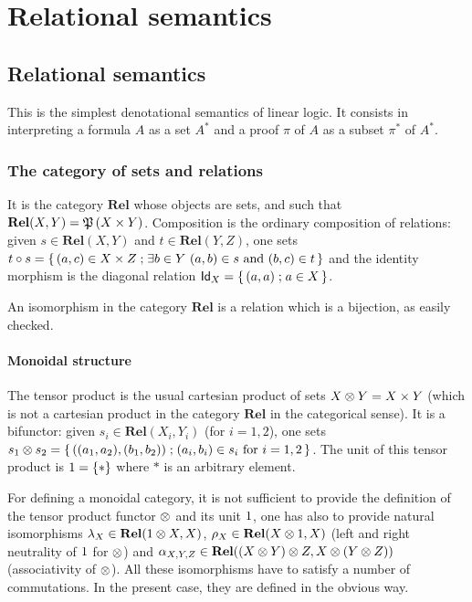 \section{Relational semantics}\label{relational-semantics}

\subsection{Relational semantics}\label{relational-semantics-1}

This is the simplest denotational semantics of linear logic. It consists
in interpreting a formula \(A\) as a set \(A^*\) and a proof \(\pi\) of
\(A\) as a subset \(\pi^*\) of \(A^*\).

\subsubsection{The category of sets and
relations}\label{the-category-of-sets-and-relations}

It is the category \(\mathbf{Rel}\) whose objects are sets, and such
that \(\mathbf{Rel}(X,Y)=\mathfrak{P}\left(X\times Y\right)\). Composition is the
ordinary composition of relations: given \(s\in\mathbf{Rel}(X,Y)\) and
\(t\in\mathbf{Rel}(Y,Z)\), one sets
\(t\circ s=\left\{\,{(a,c)\in X\times Z}\mathrel{;}{\exists b\in Y\ (a,b)\in s\ \text{and}\ (b,c)\in t}\,\right\}\)
and the identity morphism is the diagonal relation
\(\mathsf{Id}_X=\left\{\,{(a,a)}\mathrel{;}{a\in X}\,\right\}\).

An isomorphism in the category \(\mathbf{Rel}\) is a relation which is a
bijection, as easily checked.

\paragraph{Monoidal structure}\label{monoidal-structure}

The tensor product is the usual cartesian product of sets
\(X\otimes Y=X\times Y\) (which is not a cartesian product in the category
\(\mathbf{Rel}\) in the categorical sense). It is a bifunctor: given
\(s_i\in\mathbf{Rel}(X_i,Y_i)\) (for \(i=1,2\)), one sets
\(s_1\tens s_2=\set{((a_1,a_2),(b_1,b_2))}{(a_i,b_i)\in s_i\ \text{for}\ i=1,2}\).
The unit of this tensor product is \(1=\{*\}\) where \(*\) is an
arbitrary element.

For defining a monoidal category, it is not sufficient to provide the
definition of the tensor product functor \(\otimes\) and its unit
\(1\), one has also to provide natural isomorphisms
\(\lambda_X\in\mathbf{Rel}(1\otimes X,X)\),
\(\rho_X\in\mathbf{Rel}(X\otimes1,X)\) (left and right neutrality of
\(1\) for \(\otimes\)) and
\(\alpha_{X,Y,Z}\in\mathbf{Rel}((X\otimes Y)\otimes Z,X\otimes(Y\otimes Z))\)
(associativity of \(\otimes\)). All these isomorphisms have to satisfy a
number of commutations. In the present case, they are defined in the
obvious way.

